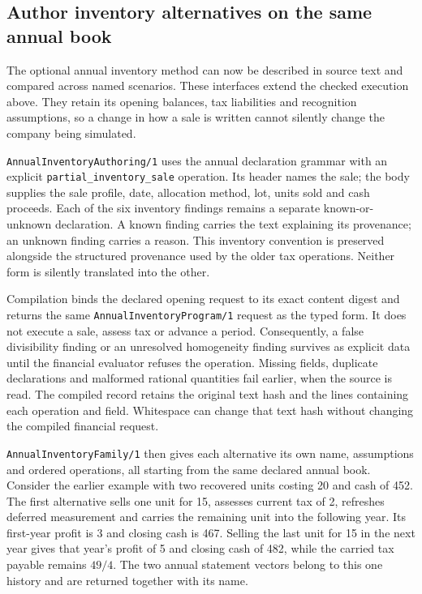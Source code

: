 

\subsection*{Author inventory alternatives on the same annual book}

The optional annual inventory method can now be described in source text and
compared across named scenarios.  These interfaces extend the checked execution
above.  They retain its opening balances, tax liabilities and recognition
assumptions, so a change in how a sale is written cannot silently change the
company being simulated.

\texttt{AnnualInventoryAuthoring/1} uses the annual declaration grammar with an
explicit \texttt{partial\_inventory\_sale} operation.  Its header names the sale;
the body supplies the sale profile, date, allocation method, lot, units sold and
cash proceeds.  Each of the six inventory findings remains a separate
known-or-unknown declaration.  A known finding carries the text explaining its
provenance; an unknown finding carries a reason.  This inventory convention is
preserved alongside the structured provenance used by the older tax
operations.  Neither form is silently translated into the other.

Compilation binds the declared opening request to its exact content digest and
returns the same \texttt{AnnualInventoryProgram/1} request as the typed form.
It does not execute a sale, assess tax or advance a period.  Consequently, a
false divisibility finding or an unresolved homogeneity finding survives as
explicit data until the financial evaluator refuses the operation.  Missing
fields, duplicate declarations and malformed rational quantities fail earlier,
when the source is read.  The compiled record retains the original text hash
and the lines containing each operation and field.  Whitespace can change
that text hash without changing the compiled financial request.

\texttt{AnnualInventoryFamily/1} then gives each alternative its own name,
assumptions and ordered operations, all starting from the same declared annual
book.  Consider the earlier example with two recovered units costing 20 and
cash of 452.  The first alternative sells one unit for 15, assesses current tax
of 2, refreshes deferred measurement and carries the remaining unit into the
following year.  Its first-year profit is 3 and closing cash is 467.  Selling the
last unit for 15 in the next year gives that year's profit of 5 and closing cash
of 482, while the carried tax payable remains \(49/4\).  The two annual statement
vectors belong to this one history and are returned together with its name.

